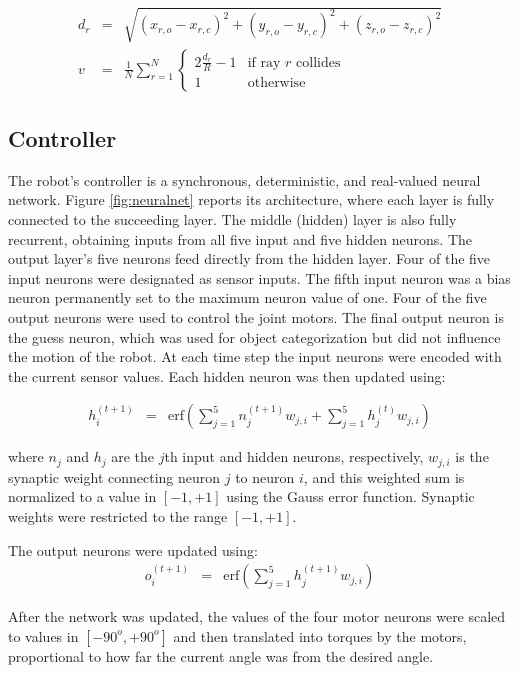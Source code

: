 \documentclass{sig-alternate}
\begin{document}
\begin{eqnarray}
  d_r &=& \sqrt{(x_{r,o} - x_{r,c})^2 + (y_{r,o} - y_{r,c})^2 + (z_{r,o} - z_{r,c})^2} \nonumber \\
  v &=& \frac{1}{N} \sum_{r=1}^{N} \begin{cases} 2 \frac{d_r}{R} - 1 & \mbox{if ray } r \mbox{ collides} \\ 1 & \mbox{otherwise} \end{cases}
\end {eqnarray}

\newpage
\subsection {Controller}

The robot's controller is a synchronous, deterministic, and real-valued neural network. Figure \ref{fig:neuralnet} reports its architecture, where each layer is fully connected to the succeeding layer. The middle (hidden) layer is also fully recurrent, obtaining inputs from all five input and five hidden neurons. The output layer's five neurons feed directly from the hidden layer. Four of the five input neurons were designated as sensor inputs. The fifth input neuron was a bias neuron permanently set to the maximum neuron value of one. Four of the five output neurons were used to control the joint motors. The final output neuron is the guess neuron, which was used for object categorization but did not influence the motion of the robot. At each time step the input neurons were encoded with the current sensor values. Each hidden neuron was then updated using:

\begin {eqnarray}
  h_i^{(t + 1)} &=& \text{erf} \left( \sum_{j=1}^{5}  n_j^{(t + 1)} w_{j,i}  + \sum_{j=1}^{5}  h_j^{(t)} w_{j,i} \right)
\end {eqnarray}

where $n_j$ and $h_j$ are the $j$th input and hidden neurons, respectively,
$w_{j,i}$ is the synaptic weight connecting neuron $j$ to neuron $i$, and
this weighted sum is normalized to a value in $[-1,+1]$ using the Gauss error function.
Synaptic weights were restricted to the range $[-1,+1]$.

The output neurons were updated using:
\begin {eqnarray}
  o_i^{(t + 1)} &=& \text{erf} \left( \sum_{j=1}^{5}  h_j^{(t + 1)} w_{j,i}  \right)
\end {eqnarray}

After the network was updated, the values of the four motor neurons were scaled to values in $[-90^o,+90^o]$ and then translated into torques by the motors, proportional
to how far the current angle was from the desired angle.
\end{document}
